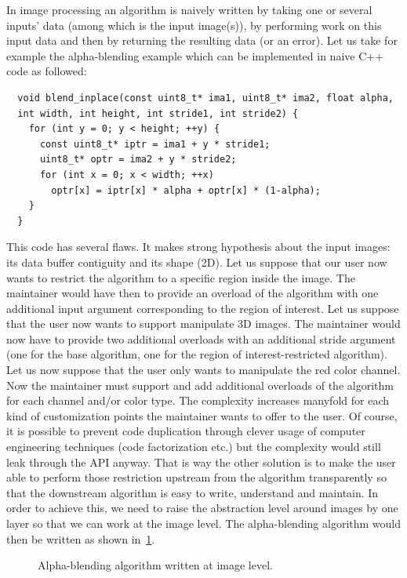 In image processing an algorithm is naively written by taking one or several inputs' data (among which is the input
image(s)),  by performing work on this input data and then by returning the resulting data (or an error). Let us take
for example the alpha-blending example which can be implemented in naive C++ code as followed:
\begin{verbatim}
  void blend_inplace(const uint8_t* ima1, uint8_t* ima2, float alpha,
  int width, int height, int stride1, int stride2) {
    for (int y = 0; y < height; ++y) {
      const uint8_t* iptr = ima1 + y * stride1;
      uint8_t* optr = ima2 + y * stride2;
      for (int x = 0; x < width; ++x)
        optr[x] = iptr[x] * alpha + optr[x] * (1-alpha);
    }
  }
\end{verbatim}

This code has several flaws. It makes strong hypothesis about the input images: its data buffer contiguity and its shape
(2D). Let us suppose that our user now wants to restrict the algorithm to a specific region inside the image. The
maintainer would have then to provide an overload of the algorithm with one additional input argument corresponding to the
region of interest. Let us suppose that the user now wants to support manipulate 3D images. The maintainer would now
have to provide two additional overloads with an additional stride argument (one for the base algorithm, one for the
region of interest-restricted algorithm). Let us now suppose that the user only wants to manipulate the red color
channel. Now the maintainer must support and add additional overloads of the algorithm for each channel and/or color
type. The complexity increases manyfold for each kind of customization points the maintainer wants to offer to the user.
Of course, it is possible to prevent code duplication through clever usage of computer engineering techniques (code
factorization etc.) but the complexity would still leak through the API anyway. That is way the other solution is to
make the user able to perform those restriction upstream from the algorithm transparently so that the downstream
algorithm is easy to write, understand and maintain. In order to achieve this, we need to raise the abstraction level
around images by one layer so that we can work at the image level. The alpha-blending algorithm would then be written as
shown in~\cref{summary:fig:view.alphablend}.

\begin{figure}[htbp]
  \centering
  

  \caption[]{Alpha-blending algorithm written at image level.}
  \label{summary:fig:view.alphablend}
\end{figure}

